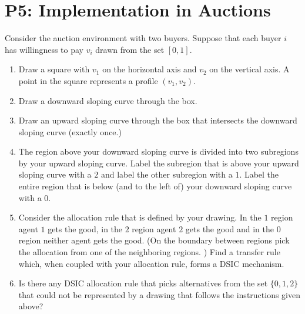 \documentclass{article}
\newcommand{\enterProblemHeader}[1]{
\nobreak\extramarks{#1}{#1 continued on next page\ldots}\nobreak
\nobreak\extramarks{#1 (continued)}{#1 continued on next page\ldots}\nobreak
}
\newcommand{\exitProblemHeader}[1]{
\nobreak\extramarks{#1 (continued)}{#1 continued on next page\ldots}\nobreak
\nobreak\extramarks{#1}{}\nobreak
}
\newcounter{homeworkProblemCounter} %
\newcommand{\homeworkProblemName}{}
\newenvironment{ex}[1][Problem \arabic{homeworkProblemCounter}]{ %
\stepcounter{homeworkProblemCounter} %
\renewcommand{\homeworkProblemName}{#1} %
\section{\homeworkProblemName} %
}{
}
\newif\ifsolutions
\begin{document}

\begin{ex}[P5: Implementation in Auctions]
	Consider the auction environment with two buyers.  Suppose that each buyer $i$ has willingness to pay
	$v_i$ drawn from the set $[0,1].$
	\begin{enumerate}
		\item Draw a square with $v_1$ on the horizontal axis and $v_2$ on the vertical axis.  A point in the square
		represents a profile $(v_1, v_2)$.
		\item Draw a downward sloping curve through the box.
		\item Draw an upward sloping curve through the box that intersects the downward sloping curve (exactly once.)
		\item The region above your downward sloping curve is divided into two subregions by your upward sloping curve.  Label
		the subregion that is above your upward sloping curve with a $2$ and label the other subregion with a $1$.  Label
		the entire region that is below (and to the left of) your downward sloping curve with a $0$.
		\item Consider the allocation rule that is defined by your drawing.  In the $1$ region agent $1$ gets the
		good, in the $2$ region agent $2$ gets the good and in the $0$ region neither agent gets the good.  (On the boundary
		between regions pick the allocation from one of the neighboring regions. )  Find a transfer rule which, when
		coupled with your allocation rule, forms a DSIC mechanism.
		\item Is there any DSIC allocation rule that picks alternatives from the set $\{0,1,2\}$ that could not be represented
		by a drawing that follows the instructions given above?
	\end{enumerate}
	
	\ifsolutions

\end{ex}
\end{document}
